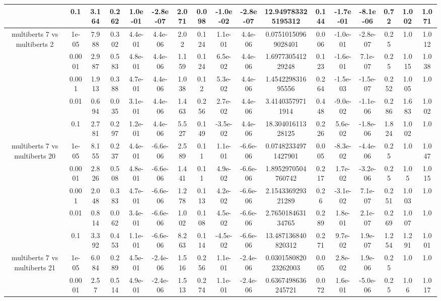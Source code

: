 \begin{tabular}{|c|c|c|c|c|c|c|c|c|c|c|c|c|c|c|c|c|}
 & 0.1 & 3.164 & 0.262 & 1.0e-01 & -2.8e-07 & 2.071 & 0.098 & -1.0e-02 & -2.8e-07 & 12.949783325195312 & 0.144 & -1.7e-01 & -8.1e-06 & 0.72 & 1.002 & 1.071 \\
\hline
\multirow{5}{*}{multiberts 7 vs multiberts 2} & 1e-05 & 7.988 & 0.302 & 4.4e-01 & 4.4e-06 & 2.02 & 0.124 & 1.1e-01 & 4.4e-06 & 0.07510150969028401 & 0.006 & -1.0e-01 & -2.8e-07 & 0.25 & 1.0 & 1.012 \\
 & 0.0001 & 2.987 & 0.583 & 4.8e-01 & 4.4e-06 & 1.159 & 0.124 & 6.5e-02 & 4.4e-06 & 1.697730541229248 & 0.123 & -1.6e-01 & 7.1e-07 & 0.25 & 1.015 & 1.038 \\
 & 0.001 & 1.913 & 0.388 & 4.7e-01 & 4.4e-06 & 1.038 & 0.12 & 5.3e-02 & 4.4e-06 & 1.454229831695556 & 0.264 & -1.5e-03 & -1.5e-07 & 0.252 & 1.005 & 1.0 \\
 & 0.01 & 0.694 & 0.035 & 3.1e-01 & 4.4e-06 & 1.463 & 0.256 & 2.7e-02 & 4.4e-06 & 3.41403579711914 & 0.448 & -9.0e-02 & -1.1e-06 & 0.286 & 1.683 & 1.002 \\
 & 0.1 & 2.781 & 0.297 & 1.2e-01 & 4.4e-06 & 5.527 & 0.149 & -3.5e-02 & 4.4e-06 & 18.30401611328125 & 0.226 & 5.6e-02 & -1.8e-06 & 1.824 & 1.002 & 1.0 \\
\hline
\multirow{5}{*}{multiberts 7 vs multiberts 20} & 1e-05 & 8.155 & 0.237 & 4.4e-01 & -6.6e-06 & 2.589 & 0.11 & 1.1e-01 & -6.6e-06 & 0.07482334971427901 & 0.005 & -8.3e-02 & -4.4e-06 & 0.25 & 1.0 & 1.047 \\
 & 0.0001 & 2.826 & 0.508 & 4.8e-01 & -6.6e-06 & 1.441 & 0.11 & 4.9e-02 & -6.6e-06 & 1.8952970504760742 & 0.217 & 1.7e-02 & -3.2e-06 & 0.25 & 1.05 & 1.015 \\
 & 0.001 & 2.048 & 0.383 & 4.7e-01 & -6.6e-06 & 1.278 & 0.113 & 4.2e-02 & -6.6e-06 & 2.154336929321289 & 0.26 & -3.1e-02 & 7.1e-07 & 0.251 & 1.003 & 1.0 \\
 & 0.01 & 0.814 & 0.062 & 3.4e-01 & -6.6e-06 & 1.002 & 0.108 & 4.5e-02 & -6.6e-06 & 2.765018463134765 & 0.289 & 1.8e-01 & 2.1e-07 & 0.269 & 1.007 & 1.0 \\
 & 0.1 & 3.392 & 0.453 & 1.1e-01 & -6.6e-06 & 8.263 & 0.114 & -4.5e-02 & -6.6e-06 & 13.487136840820312 & 0.271 & 9.7e-02 & 1.9e-07 & 1.254 & 1.291 & 1.001 \\
\hline
\multirow{5}{*}{multiberts 7 vs multiberts 21} & 1e-05 & 6.084 & 0.289 & 4.5e-01 & -2.4e-06 & 1.516 & 0.256 & 1.1e-01 & -2.4e-06 & 0.030158082023262003 & 0.005 & 2.8e-02 & 1.9e-06 & 0.25 & 1.0 & 1.0 \\
 & 0.0001 & 2.57 & 0.514 & 4.9e-01 & -2.4e-06 & 1.513 & 0.274 & 1.1e-01 & -2.4e-06 & 0.6367498636245721 & 0.072 & 1.6e-01 & -5.0e-06 & 0.25 & 1.06 & 1.017 \\

\end{tabular}
